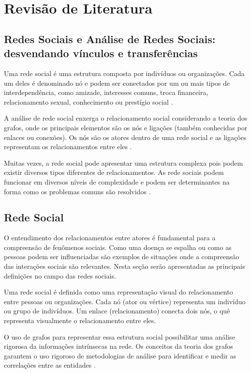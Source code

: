 \chapter{Revisão de Literatura}
\label{sec:revisao}

\section{Redes Sociais e Análise de Redes Sociais: desvendando vínculos e transferências}

Uma rede social é uma estrutura composta por indivíduos ou organizações. Cada um deles é denominado nó e podem ser conectados por um ou mais tipos de interdependência, como amizade, interesses comuns, troca financeira, relacionamento sexual, conhecimento ou prestígio social \cite{kadushin2005benefits}.

A análise de rede social enxerga o relacionamento social considerando a teoria dos grafos, onde os principais elementos são os nós e ligações (também conhecidas por enlaces ou conexões). Os nós são os atores dentro de uma rede social e as ligações representam os relacionamentos entre eles \cite{kadushin2005benefits}.

Muitas vezes, a rede social pode apresentar uma estrutura complexa pois podem existir diversos tipos diferentes de relacionamentos. As rede sociais podem funcionar em diversos níveis de complexidade e podem ser determinantes na forma como os problemas comuns são resolvidos \cite{stanley1994social}.

\section{Rede Social}
O entendimento dos relacionamentos entre atores é fundamental para a compreensão de fenômenos sociais. Como uma doença se espalha ou como as pessoas podem ser influenciadas são exemplos de situações onde a compreensão das interações sociais são relevantes. Nesta seção serão apresentadas as principais definições no campo das redes sociais.

Uma rede social é definida como uma representação visual do relacionamento entre pessoas ou organizações. Cada nó (ator ou vértice) representa um indivíduo ou grupo de indivíduos. Um enlace (relacionamento) conecta dois nós, o quê representa visualmente o relacionamento entre eles.

O uso de grafos para representar essa estrutura social possibilitar uma análise rigorosa da informações intrínsecas na rede. Os conceitos da teoria dos grafos garantem o uso rigoroso de metodologias de análise para identificar e medir as correlações entre as entidades \cite{pan2007effective}.

